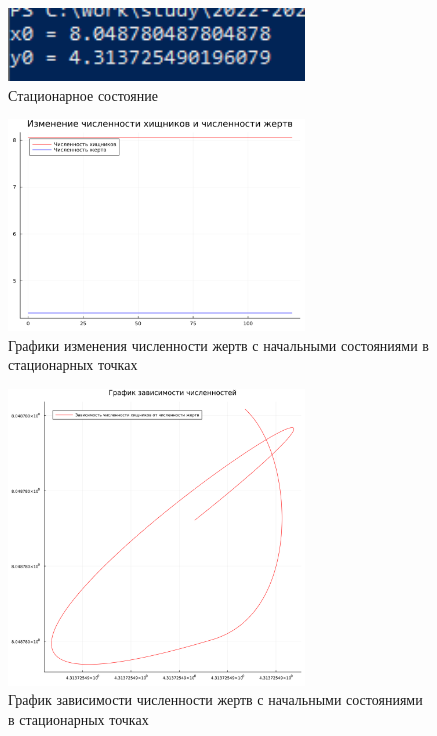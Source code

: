 \documentclass[
  12pt,
  a4paper,
]{scrreprt}
\begin{document}
\begin{figure}
\hypertarget{fig:006}{%
\centering
\includegraphics[width=0.7\textwidth,height=\textheight]{./tex2pdf.-cd896adee9a74d13/image/st_p.png}
\caption{Стационарное состояние}\label{fig:006}
}
\end{figure}

\begin{figure}
\hypertarget{fig:007}{%
\centering
\includegraphics[width=0.7\textwidth,height=\textheight]{./tex2pdf.-cd896adee9a74d13/image/second.png}
\caption{Графики изменения численности жертв с начальными состояниями в
стационарных точках}\label{fig:007}
}
\end{figure}

\begin{figure}
\hypertarget{fig:008}{%
\centering
\includegraphics[width=0.7\textwidth,height=\textheight]{./tex2pdf.-cd896adee9a74d13/image/second_php.png}
\caption{График зависимости численности жертв с начальными состояниями в
стационарных точках}\label{fig:008}
}
\end{figure}
\end{document}
